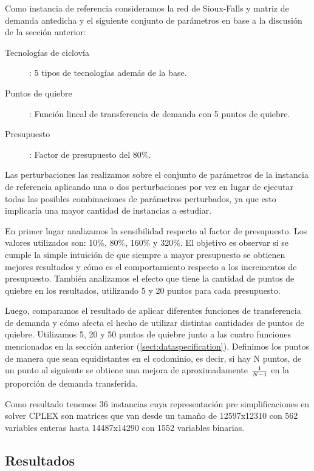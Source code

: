 Como instancia de referencia consideramos la red de Sioux-Falls y matriz de demanda antedicha y el siguiente conjunto de parámetros en base a la discusión de la sección anterior:

\begin{description}
  \item[Tecnologías de ciclovía]: 5 tipos de tecnologías además de la base.
  \item[Puntos de quiebre]: Función lineal de transferencia de demanda con 5 puntos de quiebre.
  \item[Presupuesto]: Factor de presupuesto del 80\%.
\end{description}

Las perturbaciones las realizamos sobre el conjunto de parámetros de la instancia de referencia aplicando una o dos perturbaciones por vez en lugar de ejecutar todas las posibles combinaciones de parámetros perturbados, ya que esto implicaría una mayor cantidad de instancias a estudiar.

En primer lugar analizamos la sensibilidad respecto al factor de presupuesto. Los valores utilizados son: 10\%, 80\%, 160\% y 320\%. El objetivo es observar si se cumple la simple intuición de que siempre a mayor presupuesto se obtienen mejores resultados y cómo es el comportamiento respecto a los incrementos de presupuesto. También analizamos el efecto que tiene la cantidad de puntos de quiebre en los resultados, utilizando 5 y 20 puntos para cada presupuesto.

Luego, comparamos el resultado de aplicar diferentes funciones de transferencia de demanda y cómo afecta el hecho de utilizar distintas cantidades de puntos de quiebre. Utilizamos 5, 20 y 50 puntos de quiebre junto a las cuatro funciones mencionadas en la sección anterior (\ref{sect:dataspecification}). Definimos los puntos de manera que sean equidistantes en el codominio, es decir, si hay N puntos, de un punto al siguiente se obtiene una mejora de aproximadamente ${1 \over N - 1}$ en la proporción de demanda transferida.

Como resultado tenemos 36 instancias cuya representación pre simplificaciones en solver CPLEX son matrices que van desde un tamaño de 12597x12310 con 562 variables enteras hasta 14487x14290 con 1552 variables binarias.

\FloatBarrier
\subsection{Resultados}

